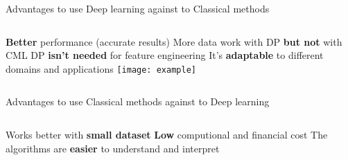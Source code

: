 \begin{frame}[t]{Advantages to use Deep learning against to Classical methods} 
        \begin{columns}[c]
                \newline
                \newline
                \textbf{Better} performance (accurate results)
                \newline
                \newline
                More data work with DP \textbf{but not} with CML
                \newline
                \newline
                DP \textbf{isn't needed} for feature engineering
                \newline
                \newline
                It's \textbf{adaptable} to different domains and applications
                \newline
                \newline
                        \texttt{[image: example]}
        \end{columns}
       
\end{frame}


\begin{frame}[t]{Advantages to use Classical methods against to  Deep learning} 
        \begin{columns}[c]
                \newline
                \newline
                Works better with \textbf{small dataset}
                \newline
                \newline
                \textbf{Low} computional and financial cost
                \newline
                \newline
                The algorithms are \textbf{easier} to understand and interpret
                \newline
                \newline
        \end{columns}
       
\end{frame}